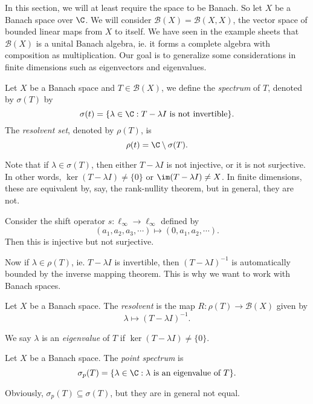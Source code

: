 \documentclass[a4paper]{article}
\begin{document}
In this section, we will at least require the space to be Banach. So let $X$ be a Banach space over $\C$. We will consider $\mathcal{B}(X) = \mathcal{B}(X, X)$, the vector space of bounded linear maps from $X$ to itself. We have seen in the example sheets that $\mathcal{B}(X)$ is a unital Banach algebra, ie. it forms a complete algebra with composition as multiplication. Our goal is to generalize some considerations in finite dimensions such as eigenvectors and eigenvalues.

\begin{defi}
  Let $X$ be a Banach space and $T \in \mathcal{B}(X)$, we define the \emph{spectrum} of $T$, denoted by $\sigma(T)$ by
  \[
    \sigma(t) = \{\lambda \in \C: T - \lambda I\text{ is not invertible}\}.
  \]
  The \emph{resolvent set}, denoted by $\rho(T)$, is
  \[
    \rho(t) = \C \setminus \sigma(T).
  \]
\end{defi}
Note that if $\lambda \in \sigma(T)$, then either $T - \lambda I$ is not injective, or it is not surjective. In other words, $\ker (T - \lambda I) \not= \{0\}$ or $\im (T - \lambda I) \not= X$. In finite dimensions, these are equivalent by, say, the rank-nullity theorem, but in general, they are not.

\begin{eg}
  Consider the shift operator $s: \ell_\infty \to \ell_\infty$ defined by
  \[
    (a_1, a_2, a_3, \cdots) \mapsto (0, a_1, a_2, \cdots).
  \]
  Then this is injective but not surjective.
\end{eg}
Now if $\lambda \in \rho(T)$, ie. $T - \lambda I$ is invertible, then $(T - \lambda I)^{-1}$ is automatically bounded by the inverse mapping theorem. This is why we want to work with Banach spaces.

\begin{defi}[Resolvent]
  Let $X$ be a Banach space. The \emph{resolvent} is the map $R: \rho(T) \to \mathcal{B}(X)$ given by
  \[
    \lambda \mapsto (T - \lambda I)^{-1}.
  \]
\end{defi}

\begin{defi}[Eigenvalue]
  We say $\lambda$ is an \emph{eigenvalue} of $T$ if $\ker (T - \lambda I) \not= \{0\}$.
\end{defi}

\begin{defi}
  Let $X$ be a Banach space. The \emph{point spectrum} is
  \[
    \sigma_p(T) = \{\lambda \in \C: \lambda\text{ is an eigenvalue of }T\}.
  \]
\end{defi}
Obviously, $\sigma_p(T) \subseteq \sigma(T)$, but they are in general not equal.
\end{document}

